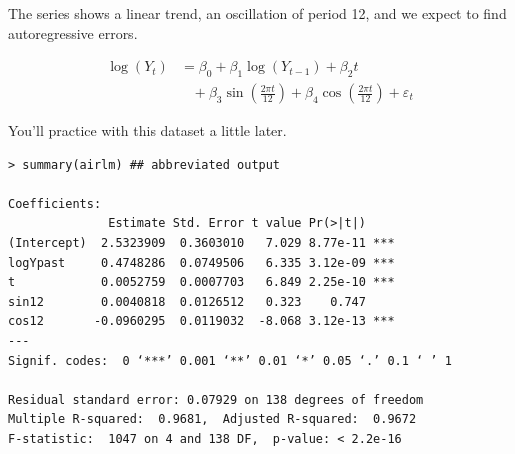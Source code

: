 \documentclass[12pt,xcolor=svgnames]{beamer}
\newcommand{\rd}{\color{red}}
\newcommand{\bl}{\color{blue}}
\newcommand{\sk}{\vspace{.4cm}}
\newcommand{\nochap}{\vspace{0.5cm}}
\newcommand{\nsk}{\vspace{-.4cm}}
\begin{document}
\begin{frame}[fragile]
\nochap

The series shows a linear trend, an oscillation of period 12, 
and we expect to find autoregressive errors.  

\nsk
{\rd 
\begin{align*}
\log(Y_t) &= \beta_0 + \beta_1 \log(Y_{t-1}) + \beta_2t \\
&\;\;\; + \beta_3\sin\left(\frac{2\pi t }{12}\right) + \beta_4\cos\left(\frac{2\pi t }{12}\right)
+ \varepsilon_t 
\end{align*}
}

\sk
You'll practice with this dataset a little later.


\end{frame}



\iffalse 
\begin{frame}[fragile]
\nochap

\vspace{-0.25cm}
{\bl \footnotesize
\begin{verbatim}
> summary(airlm) ## abbreviated output

Coefficients:
              Estimate Std. Error t value Pr(>|t|)    
(Intercept)  2.5323909  0.3603010   7.029 8.77e-11 ***
logYpast     0.4748286  0.0749506   6.335 3.12e-09 ***
t            0.0052759  0.0007703   6.849 2.25e-10 ***
sin12        0.0040818  0.0126512   0.323    0.747    
cos12       -0.0960295  0.0119032  -8.068 3.12e-13 ***
---
Signif. codes:  0 ‘***’ 0.001 ‘**’ 0.01 ‘*’ 0.05 ‘.’ 0.1 ‘ ’ 1

Residual standard error: 0.07929 on 138 degrees of freedom
Multiple R-squared:  0.9681,  Adjusted R-squared:  0.9672 
F-statistic:  1047 on 4 and 138 DF,  p-value: < 2.2e-16
\end{verbatim}
}

\end{frame}
\end{document}
